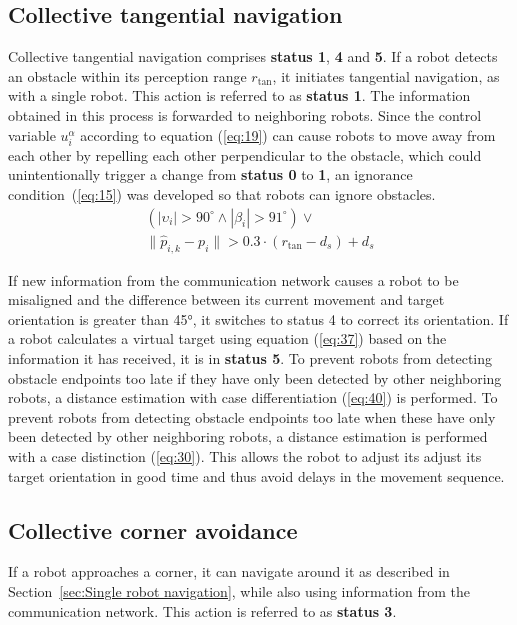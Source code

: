 \documentclass[conference]{IEEEtran}
\begin{document}
\subsection*{Collective tangential navigation}
Collective tangential navigation comprises 
\textbf{status 1}, \textbf{4} and \textbf{5}. If a 
robot detects an obstacle within its perception range \( r_{\mathrm{tan}} \), it initiates 
tangential navigation, as with a single robot. This action is referred to as 
\textbf{status 1}. The information obtained in this process is forwarded to neighboring 
robots.
Since the control variable \( u_i^\alpha \) according to equation (\eqref{eq:19}) can cause robots 
to move away from each other by repelling each other perpendicular to the obstacle, which could unintentionally 
trigger a change from \textbf{status 0} to \textbf{1}, an 
ignorance condition~(\ref{eq:15}) 
was developed so that robots can ignore obstacles.
\begin{equation}
    \begin{split}
    (|\upsilon_i| > 90^\circ \wedge |\beta_i| > 91^\circ) \vee \\
    \| \hat{p}_{i,k} - p_i \| > 0.3 \cdot (r_{\text{tan}} - d_s) + d_s
    \end{split}
    \label{eq:15}
\end{equation}

If new information from the communication network causes a robot to be 
misaligned and the difference between its current movement 
and target orientation is greater than 45°, it switches to 
status 4 to correct its orientation.
If a robot calculates a virtual target using equation (\eqref{eq:37}) based on the information 
it has received, it is in \textbf{status 5}.
To prevent robots from detecting obstacle endpoints too late if they have only been detected 
by other neighboring robots, a distance estimation with case differentiation 
(\eqref{eq:40}) is performed.
To prevent robots from detecting obstacle endpoints too late when these have only 
been detected by other neighboring robots, a distance estimation is performed with 
a case distinction (\eqref{eq:30}). This allows the robot to adjust its 
adjust its target orientation in good time and thus avoid delays in the movement sequence.

\subsection*{Collective corner avoidance}
If a robot approaches a corner, it can 
navigate around it as described in Section~\ref{sec:Single robot navigation}, 
while also using information from the communication network. 
This action is referred to as \textbf{status 3}.
\end{document}
